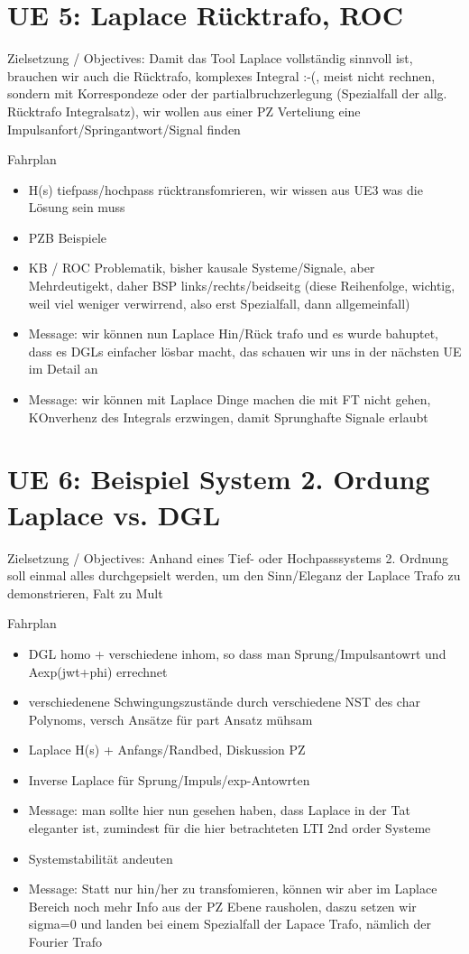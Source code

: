 \newpage
\section{UE 5: Laplace Rücktrafo, ROC}
Zielsetzung / Objectives: Damit das Tool Laplace vollständig sinnvoll ist, brauchen wir auch die Rücktrafo,
komplexes Integral :-(, meist nicht rechnen, sondern mit Korrespondeze oder der
partialbruchzerlegung (Spezialfall der allg. Rücktrafo Integralsatz), wir wollen aus einer PZ Verteliung eine Impulsanfort/Springantwort/Signal finden

Fahrplan
\begin{itemize}
\item H(s) tiefpass/hochpass rücktransfomrieren, wir wissen aus UE3 was die Lösung sein muss
\item PZB Beispiele
\item KB / ROC Problematik, bisher kausale Systeme/Signale, aber Mehrdeutigekt, daher BSP links/rechts/beidseitg (diese Reihenfolge, wichtig, weil viel weniger verwirrend, also erst Spezialfall, dann allgemeinfall)
\item Message: wir können nun Laplace Hin/Rück trafo und es wurde bahuptet, dass es DGLs einfacher lösbar macht, das schauen wir uns in der nächsten UE im Detail an
\item Message: wir können mit Laplace Dinge machen die mit FT nicht gehen, KOnverhenz des Integrals erzwingen, damit Sprunghafte Signale erlaubt
\end{itemize}


\newpage
\section{UE 6: Beispiel System 2. Ordung Laplace vs. DGL}
Zielsetzung / Objectives: Anhand eines Tief- oder Hochpasssystems 2. Ordnung soll
einmal alles durchgepsielt werden, um den Sinn/Eleganz der Laplace Trafo zu demonstrieren, Falt zu Mult

Fahrplan
\begin{itemize}
\item DGL homo + verschiedene inhom, so dass man Sprung/Impulsantowrt und Aexp(jwt+phi) errechnet
\item verschiedenene Schwingungszustände durch verschiedene NST des char Polynoms, versch Ansätze für part Ansatz mühsam
\item Laplace H(s) + Anfangs/Randbed, Diskussion PZ
\item Inverse Laplace für Sprung/Impuls/exp-Antowrten
\item Message: man sollte hier nun gesehen haben, dass Laplace in der Tat eleganter ist, zumindest für die hier betrachteten LTI 2nd order Systeme
\item Systemstabilität andeuten
\item Message: Statt nur hin/her zu transfomieren, können wir aber im Laplace Bereich noch mehr Info aus der PZ Ebene rausholen, daszu setzen wir sigma=0 und landen bei
einem Spezialfall der Lapace Trafo, nämlich der Fourier Trafo
\end{itemize}


